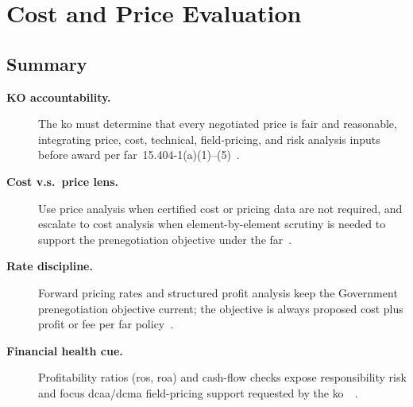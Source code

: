 \documentclass[../main.tex]{subfiles}
\begin{document}

\section{Cost and Price Evaluation}

\subsection{Summary}
\begin{description}
  \item[\textbf{KO accountability.}] The \ac{ko} must determine that every negotiated price is fair and reasonable, integrating price, cost, technical, field-pricing, and risk analysis inputs before award per \ac{far}~15.404-1(a)(1)--(5)~\autocite[\S~15.404-1(a)]{FAR}.
  \item[\textbf{Cost v.s.\ price lens.}] Use price analysis when certified cost or pricing data are not required, and escalate to cost analysis when element-by-element scrutiny is needed to support the prenegotiation objective under the \ac{far}~\autocite[\S\S~15.404-1(b), 15.404-1(c)]{FAR}.
  \item[\textbf{Rate discipline.}] Forward pricing rates and structured profit analysis keep the Government prenegotiation objective current; the objective is always proposed cost plus profit or fee per \ac{far} policy~\autocite[\S\S~15.401, 15.404-4, 15.407-3]{FAR}.
  \item[\textbf{Financial health cue.}] Profitability ratios (\gls{ros}, \gls{roa}) and cash-flow checks expose responsibility risk and focus \gls{dcaa}/\gls{dcma} field-pricing support requested by the \gls{ko}~\autocite[\S~9.104-1]{FAR}~\autocite{edo-3-2-4-cost-price-evaluation-2024}.
\end{description}
\end{document}
